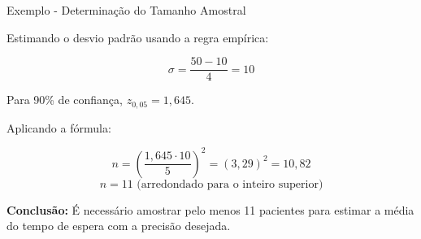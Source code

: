 \documentclass[14pt,aspectratio=1610]{beamer}
\begin{document}
	\begin{frame}{Exemplo - Determinação do Tamanho Amostral}
		\vspace{-0.5cm}
		\small
		\begin{block}{}
			
			Estimando o desvio padrão usando a regra empírica:
			
			\[
			\sigma = \frac{50 - 10}{4} = 10
			\]
			
			Para 90\% de confiança, \(z_{0,05} = 1,645\).
			
			Aplicando a fórmula:
			
			\[
			n = \left( \frac{1,645 \cdot 10}{5} \right)^2 = (3,29)^2 = 10,82
			\]
			\[
			n = 11 \text{ (arredondado para o inteiro superior)}
			\]
			
			\textbf{Conclusão:} É necessário amostrar pelo menos 11 pacientes para estimar a média do tempo de espera com a precisão desejada.
			
		\end{block}
		\nocite{Morettin09, Apostila, eric, montgomery2016, meyer1982probabilidade, Bastos2025}
	\end{frame}
	
	
	
\end{document}
